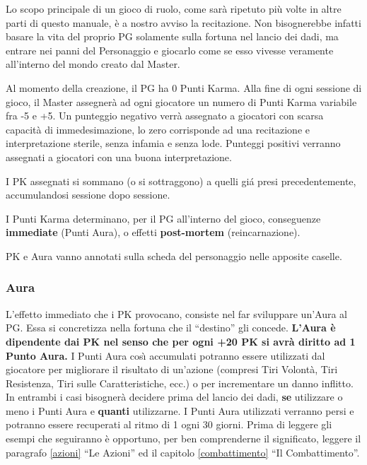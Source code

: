 Lo scopo principale di un gioco di ruolo, come sar\`a ripetuto pi\`u
volte in altre parti di questo manuale, \`e a nostro avviso la
recitazione. Non bisognerebbe infatti basare la vita del proprio PG
solamente sulla fortuna nel lancio dei dadi, ma entrare nei panni del
Personaggio e giocarlo come se esso vivesse veramente all'interno del
mondo creato dal Master.

\iffullversion 
Al momento della creazione, il PG ha 0 Punti Karma.
Alla fine di ogni sessione di gioco, il Master assegner\`a ad ogni
giocatore un numero di Punti Karma variabile fra -5 e +5. Un punteggio
negativo verr\`a assegnato a giocatori con scarsa capacit\`a di
immedesimazione, lo zero corrisponde ad una recitazione e
interpretazione sterile, senza infamia e senza lode. Punteggi positivi
verranno assegnati a giocatori con una buona interpretazione.

I PK assegnati si sommano (o si sottraggono) a quelli gi\'a presi
precedentemente, accumulandosi sessione dopo sessione.

I Punti Karma determinano, per il PG all'interno del gioco,
conseguenze \textbf{immediate} (Punti Aura), o effetti
\textbf{post-mortem} (reincarnazione).

PK e Aura vanno annotati sulla scheda del personaggio nelle apposite
caselle.

\subsubsection{Aura}

L'effetto immediato che i PK provocano, consiste nel far sviluppare
un'Aura al PG. Essa si concretizza nella fortuna che il ``destino''
gli concede. \textbf{L'Aura \`e dipendente dai PK nel senso che per ogni +20
PK si avr\`a diritto ad 1 Punto Aura.} I Punti Aura cos\`{\i}
accumulati potranno essere utilizzati dal giocatore per migliorare il
risultato di un'azione (compresi Tiri Volont\`a, Tiri Resistenza, Tiri
sulle Caratteristiche, ecc.) o per incrementare un danno inflitto. In
entrambi i casi bisogner\`a decidere prima del lancio dei dadi,
\textbf{se} utilizzare o meno i Punti Aura e \textbf{quanti}
utilizzarne.
I Punti Aura utilizzati verranno persi e potranno essere recuperati al
ritmo di 1 ogni 30 giorni. Prima di leggere gli esempi che seguiranno
\`e opportuno, per ben comprenderne il significato, leggere il
paragrafo \ref{azioni} ``Le Azioni'' ed il capitolo
\ref{combattimento} ``Il Combattimento''.

